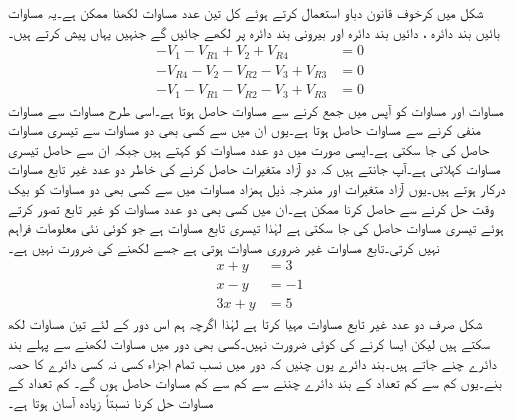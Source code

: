 شکل  میں کرخوف قانون دباو استعمال کرتے ہوئے کل تین عدد مساوات لکھنا ممکن ہے۔یہ مساوات بائیں بند دائرہ ، دائیں بند دائرہ  اور بیرونی بند دائرہ  پر لکھے جائیں گے جنہیں یہاں پیش کرتے ہیں۔
\begin{align}
-V_1-V_{R1}+V_2+V_{R4}&=0  \label{مساوات_مزاحمتی_تابع_الف}\\
-V_{R4}-V_2-V_{R2}-V_3+V_{R3}&=0  \label{مساوات_مزاحمتی_تابع_ب}\\
-V_1-V_{R1}-V_{R2}-V_3+V_{R3}&=0  \label{مساوات_مزاحمتی_تابع_پ}
\end{align}
مساوات  اور مساوات  کو آپس میں جمع کرنے سے مساوات  حاصل ہوتا ہے۔اسی طرح مساوات  سے مساوات  منفی کرنے سے مساوات  حاصل ہوتا ہے۔یوں ان میں سے کسی بھی دو مساوات سے تیسری مساوات حاصل کی جا سکتی ہے۔ایسی صورت میں دو عدد مساوات کو  کہتے ہیں جبکہ ان سے حاصل تیسری مساوات  کہلاتی ہے۔آپ جانتے ہیں کہ دو آزاد متغیرات حاصل کرنے کی خاطر دو عدد غیر تابع مساوات درکار ہوتے ہیں۔یوں آزاد متغیرات  اور  مندرجہ ذیل ہمزاد مساوات  میں سے کسی بھی دو مساوات کو بیک وقت حل کرنے سے حاصل کرنا ممکن ہے۔ان میں کسی بھی دو عدد مساوات کو غیر تابع تصور کرتے ہوئے تیسری مساوات حاصل کی جا سکتی ہے لہٰذا تیسری تابع مساوات ہے جو کوئی نئی معلومات فراہم نہیں کرتی۔تابع مساوات غیر ضروری مساوات ہوتی ہے جسے لکھنے کی ضرورت نہیں ہے۔
\begin{align*}
x+y&=3\\
x-y&=-1\\
3x+y&=5
\end{align*}
شکل  صرف دو عدد غیر تابع مساوات مہیا کرتا ہے لہٰذا اگرچہ ہم اس دور کے لئے تین مساوات لکھ سکتے ہیں لیکن ایسا کرنے کی کوئی ضرورت نہیں۔کسی بھی دور میں مساوات لکھنے سے پہلے بند دائرے چنے جاتے ہیں۔بند دائرے یوں چنیں کہ دور میں نسب تمام اجزاء کسی نہ کسی دائرے کا حصہ بنے۔یوں کم سے کم تعداد کے بند دائرے چننے سے کم سے کم مساوات حاصل ہوں گے۔ کم تعداد کے مساوات حل کرنا نسبتاً زیادہ آسان ہوتا ہے۔

